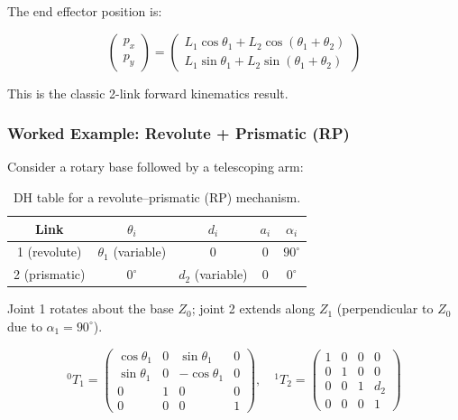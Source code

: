 \documentclass[12pt,a4paper]{article}
\begin{document}
The end effector position is:

\begin{equation}
\boxed{
  \begin{pmatrix} p_x \\ p_y \end{pmatrix}
  = \begin{pmatrix}
      L_1\cos\theta_1 + L_2\cos(\theta_1+\theta_2) \\
      L_1\sin\theta_1 + L_2\sin(\theta_1+\theta_2)
    \end{pmatrix}
}
\end{equation}

This is the classic 2-link forward kinematics result.

\subsubsection*{Worked Example: Revolute + Prismatic (RP)}

Consider a rotary base followed by a telescoping arm:

\begin{table}[h]
\centering
\begin{tabular}{@{}ccccc@{}}
\toprule
\textbf{Link} & $\theta_i$ & $d_i$ & $a_i$ & $\alpha_i$ \\
\midrule
1 (revolute)  & $\theta_1$ (variable) & 0   & 0 & $90^\circ$ \\
2 (prismatic) & $0^\circ$             & $d_2$ (variable) & 0 & $0^\circ$ \\
\bottomrule
\end{tabular}
\caption{DH table for a revolute--prismatic (RP) mechanism.}
\end{table}

Joint 1 rotates about the base $Z_0$; joint 2 extends along $Z_1$
(perpendicular to $Z_0$ due to $\alpha_1 = 90^\circ$).

\begin{equation}
  {}^{0}T_1 =
  \begin{pmatrix}
    \cos\theta_1 & 0 & \sin\theta_1 & 0 \\
    \sin\theta_1 & 0 & -\cos\theta_1 & 0 \\
    0 & 1 & 0 & 0 \\
    0 & 0 & 0 & 1
  \end{pmatrix},\quad
  {}^{1}T_2 =
  \begin{pmatrix}
    1 & 0 & 0 & 0 \\
    0 & 1 & 0 & 0 \\
    0 & 0 & 1 & d_2 \\
    0 & 0 & 0 & 1
  \end{pmatrix}
\end{equation}
\end{document}
